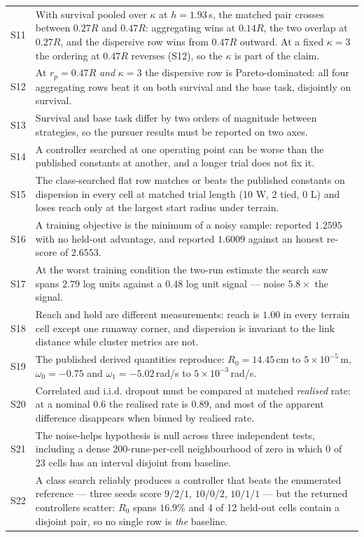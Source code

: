 \documentclass[11pt,a4paper]{article}
\begin{document}
\begin{longtable}{p{}p{}}
S11 & With survival pooled over $\kappa$ at $h = 1.93$\,s, the matched pair crosses between $0.27R$ and $0.47R$: aggregating wins at $0.14R$, the two overlap at $0.27R$, and the dispersive row wins from $0.47R$ outward. At a fixed $\kappa = 3$ the ordering at $0.47R$ reverses (S12), so the $\kappa$ is part of the claim. \\
S12 & At $r_p = 0.47R$ \emph{and} $\kappa = 3$ the dispersive row is Pareto-dominated: all four aggregating rows beat it on both survival and the base task, disjointly on survival. \\
S13 & Survival and base task differ by two orders of magnitude between strategies, so the pursuer results must be reported on two axes. \\
S14 & A controller searched at one operating point can be worse than the published constants at another, and a longer trial does not fix it. \\
S15 & The class-searched flat row matches or beats the published constants on dispersion in every cell at matched trial length (10 W, 2 tied, 0 L) and loses reach only at the largest start radius under terrain. \\
S16 & A training objective is the minimum of a noisy sample: reported $1.2595$ with no held-out advantage, and reported $1.6009$ against an honest re-score of $2.6553$. \\
S17 & At the worst training condition the two-run estimate the search saw spans $2.79$ log units against a $0.48$ log unit signal --- noise $5.8\times$ the signal. \\
S18 & Reach and hold are different measurements: reach is $1.00$ in every terrain cell except one runaway corner, and dispersion is invariant to the link distance while cluster metrics are not. \\
S19 & The published derived quantities reproduce: $R_0 = 14.45$\,cm to $5\times10^{-5}$\,m, $\omega_0 = -0.75$ and $\omega_1 = -5.02$\,rad/s to $5\times10^{-3}$\,rad/s. \\
S20 & Correlated and i.i.d. dropout must be compared at matched \emph{realised} rate: at a nominal $0.6$ the realised rate is $0.89$, and most of the apparent difference disappears when binned by realised rate. \\
S21 & The noise-helps hypothesis is null across three independent tests, including a dense 200-runs-per-cell neighbourhood of zero in which 0 of 23 cells has an interval disjoint from baseline. \\
S22 & A class search reliably produces a controller that beats the enumerated reference --- three seeds score $9/2/1$, $10/0/2$, $10/1/1$ --- but the returned controllers scatter: $R_0$ spans $16.9\%$ and 4 of 12 held-out cells contain a disjoint pair, so no single row is \emph{the} baseline. \\
\bottomrule
\end{longtable}
\end{document}
